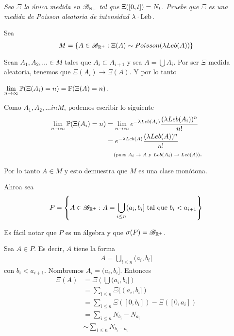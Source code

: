 \emph{
	Sea $\Xi$ la \'unica medida en $\mc{B}_{\re_+}$ tal que $\imf{\Xi}{[0,t]}=N_t$. Pruebe que 
	$\Xi$ es una medida de Poisson aleatoria de intensidad $\lambda \cdot\leb$.
}

\afterstatement\pn

Sea
\begin{align}
    M = \left\{ A \in \B_{\R^+} : \Xi(A) \sim Poisson(\lambda Leb(A)) \right\}
\end{align}

Sean $A_1, A_2, \dots \in M$ tales que $A_i \subset A_{i+1}$ y sea $A = \bigcup A_i$. Por ser $\Xi$ medida
aleatoria, tenemos que $\Xi(A_i) \longrightarrow \Xi(A)$. Y por lo tanto \par
$\lim\limits_{n \rightarrow \infty} \P(\Xi(A_i) = n) = \P(\Xi(A) = n)$.\pn

Como $A_1, A_2, \dots in M$, podemos escribir lo siguiente
\begin{align}
    \lim_{n \rightarrow \infty} \P(\Xi(A_i) = n)    &=  \lim_{n \rightarrow \infty} e^{-\lambda Leb(A_i)} \frac{(\lambda Leb(A_i))^n}{n!}       \\
                                                    &=  e^{-\lambda Leb(A)} \frac{(\lambda Leb(A))^n}{n!}                                       \\
                                                    &\comment{pues $A_i \rightarrow A$ y $Leb(A_i) \rightarrow Leb(A)$}.
\end{align}

Por lo tanto $A \in M$ y esto demuestra que $M$ es una clase monótona.\pn

Ahroa sea
\begin{align}
    P = \left\{  A \in \B_{\R^+} : A = \bigcup_{ i  \leq n } (a_i, b_i] \text{ tal que } b_i < a_{i+1} \right\}
\end{align}\pn

Es fácil notar que $P$ es un álgebra y que $\sigma(P) = \B_{\R^+}$.\pn

Sea $A \in P$. Es decir, $A$ tiene la forma
\begin{align}
    A = \bigcup_{ i  \leq n } (a_i, b_i]
\end{align}
con $b_i < a_{i+1}$. Nombremos $A_i = (a_i, b_i]$. Entonces
\begin{align}
    \Xi(A)  &=      \Xi\left(\bigcup (a_i, b_i] \right)                         \\
            &=      \sum_{i \leq n}     \Xi((a_i, b_i])                         \\
            &=      \sum_{i \leq n}     \Xi([0, b_i])  -\Xi([0, a_i])           \\
            &=      \sum_{i \leq n}     N_{b_i}  -  N_{a_i}                     \\
            &\sim   \sum_{i \leq n}     N_{b_i - a_i} 
\end{align}\pn

